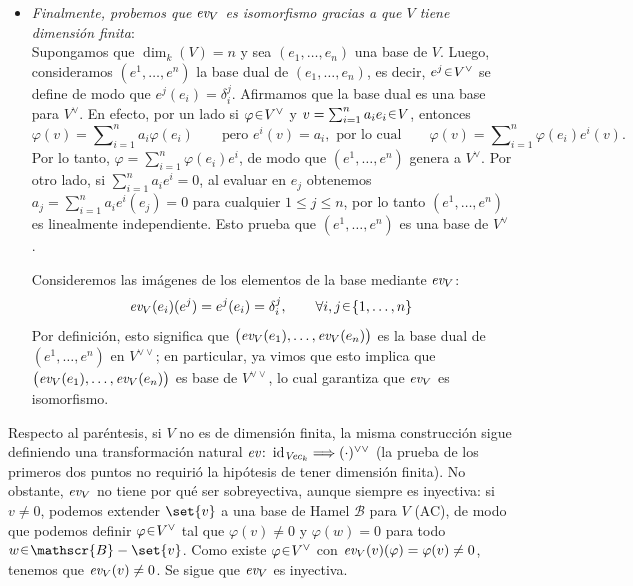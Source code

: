 \begin{sol}
\begin{itemize}
\item\emph{Finalmente, probemos que $\operatorname{\textit{ev}}_V$ es isomorfismo gracias a que $V$ tiene dimensión finita}:\\
Supongamos que $\dim_k(V)=n$ y sea $(e_1,\ldots,e_n)$ una base de $V$. Luego, consideramos $(e^1,\ldots,e^n)$ la base dual de $(e_1,\ldots,e_n)$, es decir, $e^j\en V^\vee$ se define de modo que $e^j(e_i)=\delta_i^j$. Afirmamos que la base dual es una base para $V^\vee$. En efecto, por un lado si $\varphi\en V^\vee$ y $v=\sum_{i=1}^n a_i e_i\en V$, entonces
\[
\varphi(v)
=\sum\nolimits_{i=1}^n a_i\varphi(e_i)
\qquad\text{pero } e^i(v) = a_i, \text{ por lo cual}\qquad
\varphi(v)
=\sum\nolimits_{i=1}^n \varphi(e_i)e^i(v).
\]
Por lo tanto, $\varphi=\sum_{i=1}^n\varphi(e_i)e^i$, de modo que
$(e^1,\ldots,e^n)$ genera a $V^\vee$.
Por otro lado, si $\sum_{i=1}^n a_i e^i=0$, al evaluar en $e_j$ obtenemos
$a_j=\sum_{i=1}^n a_i e^i(e_j)=0$ para cualquier $1\le j\leq n$, por lo tanto
$(e^1,\ldots,e^n)$ es linealmente independiente. Esto prueba que
$(e^1,\ldots,e^n)$ es una base de $V^\vee$.

Consideremos las imágenes de los elementos de la base mediante
$\operatorname{\textit{ev}}_V$:
\[
\ev_V(e_i)(e^j)
=
e^j(e_i)
=
\delta_i^j,
\qquad\forall i,j\en\{1,\ldots,n\}
\]
Por definición, esto significa que $\bigl(\operatorname{\textit{ev}}_V(e_1),\ldots,\operatorname{\textit{ev}}_V(e_n)\bigr)$ es la base dual de $(e^1,\ldots,e^n)$
en $V^{\vee\vee}$; en particular, ya vimos que esto implica que $\bigl(\operatorname{\textit{ev}}_V(e_1),\ldots,\operatorname{\textit{ev}}_V(e_n)\bigr)$ es base de $V^{\vee\vee}$, lo cual garantiza que $\operatorname{\textit{ev}}_V$ es isomorfismo.
\end{itemize}

\begin{nota}
Respecto al paréntesis, si $V$ no es de dimensión finita, la misma
construcción sigue definiendo una transformación natural $\operatorname{\textit{ev}}\colon\operatorname{id}_{\textit{Vec}_k}\Longrightarrow(\cdot)^{\vee\vee}$ (la prueba de los primeros dos puntos no requirió la hipótesis de tener dimensión finita). No obstante, $\operatorname{\textit{ev}}_V$ no tiene por qué ser sobreyectiva, aunque siempre es inyectiva: si $v\neq 0$, podemos extender $\set{v}$ a una base de Hamel $\mathscr{B}$ para $V$ (AC), de modo que podemos definir $\varphi\en V^\vee$ tal que $\varphi(v)\neq0$ y $\varphi(w)=0$ para todo $w\en\mathscr{B}-\set{v}$. Como existe $\varphi\en V^\vee$ con $\operatorname{\textit{ev}}_V(v)(\varphi) = \varphi(v) \neq 0$, tenemos que $\operatorname{\textit{ev}}_V(v) \neq0$. Se sigue que $\operatorname{\textit{ev}}_V$ es inyectiva.   
\end{nota}
\end{sol}
